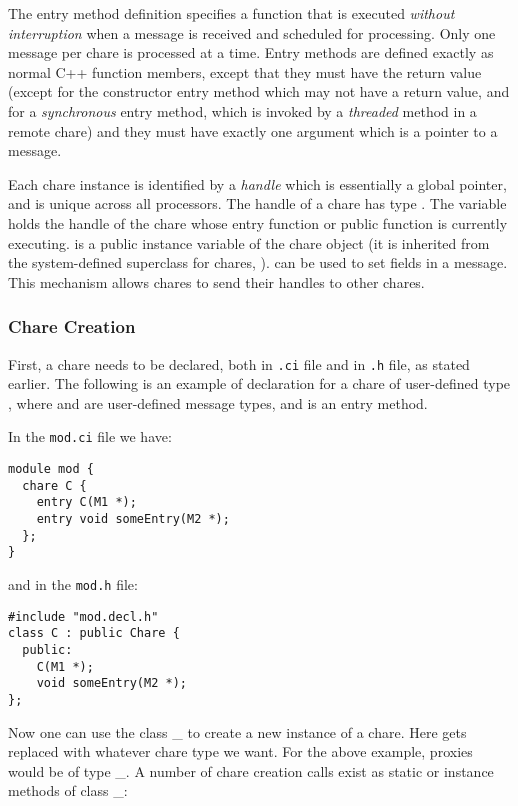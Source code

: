 The entry method definition specifies a function that is executed {\it
without interruption} when a message is received and scheduled for
processing. Only one message per chare is processed at a time.  Entry
methods are defined exactly as normal C++ function members, except
that they must have the return value  (except for the
constructor entry method which may not have a return value, and for a {\em synchronous}
entry method, which is invoked by a {\em threaded} method in a remote chare) and they
must have exactly one argument which is a pointer to a
message.

Each chare instance is identified by a {\it handle} 
which is essentially a global pointer, and is unique across all
processors.  The handle of a chare has type .  The
variable  holds the handle of the
chare whose entry function or public function is currently executing.
 is a public instance variable of the chare object
(it is inherited from the system-defined superclass for chares, ).
 can be used to set fields in a message. This  
mechanism allows chares to send their handles to other chares.

\subsubsection{Chare Creation}
\label{chare creation}

First, a chare needs to be declared, both in {\tt .ci} file and in
{\tt .h} file, as stated earlier. The following is an example of
declaration for a chare of user-defined type , where 
and  are user-defined message types, and 
is an entry method.

In the {\tt mod.ci} file we have:

\begin{verbatim}
module mod {
  chare C {
    entry C(M1 *);
    entry void someEntry(M2 *);
  };
}
\end{verbatim}

and in the {\tt mod.h} file:

\begin{verbatim}
#include "mod.decl.h"
class C : public Chare {
  public:
    C(M1 *);
    void someEntry(M2 *);
};
\end{verbatim}

Now one can use the class \_ to create
a new instance of a chare.  Here  gets replaced with
whatever chare type we want.  For the above example, proxies would
be of type \_. A number of chare creation calls
exist as static or instance methods of class \_:

